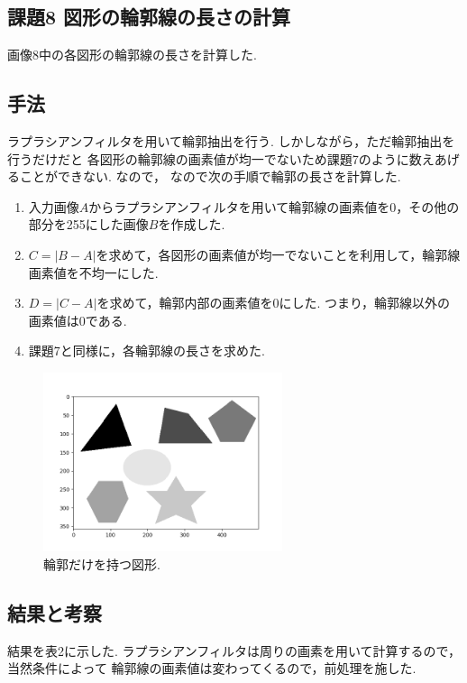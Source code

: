 \documentclass[twocolumn, 10pt,a4j]{jsarticle}
\begin{document}
\subsection{課題8 図形の輪郭線の長さの計算}
画像8中の各図形の輪郭線の長さを計算した.


  \subsection{手法}
ラプラシアンフィルタを用いて輪郭抽出を行う. しかしながら，ただ輪郭抽出を行うだけだと
各図形の輪郭線の画素値が均一でないため課題7のように数えあげることができない. なので，
なので次の手順で輪郭の長さを計算した.
\begin{enumerate}
    \item 入力画像$A$からラプラシアンフィルタを用いて輪郭線の画素値を0，その他の部分を255にした画像$B$を作成した. \\
    \item $C = |B - A|$を求めて，各図形の画素値が均一でないことを利用して，輪郭線画素値を不均一にした. \\
    \item $D = |C - A|$を求めて，輪郭内部の画素値を0にした. つまり，輪郭線以外の画素値は0である. \\
    \item 課題7と同様に，各輪郭線の長さを求めた.
\end{enumerate}

  \begin{figure}[H]
    \begin{center}
        \includegraphics[width=7cm]{../img/kadai_7.png}
        \caption{輪郭だけを持つ図形.}
    \end{center}
    \end{figure}

  \subsection{結果と考察}
  結果を表2に示した. ラプラシアンフィルタは周りの画素を用いて計算するので，当然条件によって
  輪郭線の画素値は変わってくるので，前処理を施した.
    
\end{document}
